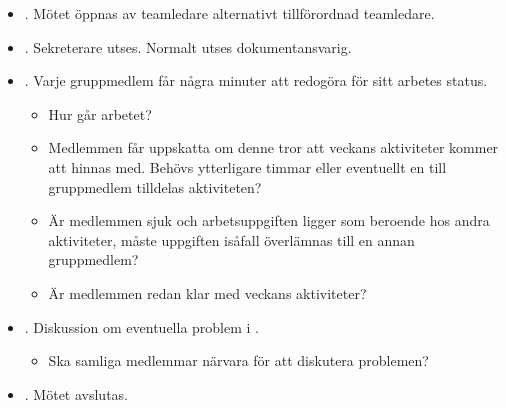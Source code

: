 \vspace{10mm}

\begin{itemize}
\item{. Mötet öppnas av teamledare alternativt tillförordnad teamledare.}
\item{. Sekreterare utses. Normalt utses dokumentansvarig.}
\item{. Varje gruppmedlem får några minuter att redogöra för sitt arbetes status.
  \begin{itemize}
  \item{Hur går arbetet?}
  \item{Medlemmen får uppskatta om denne tror att veckans aktiviteter kommer att hinnas med. Behövs ytterligare timmar eller eventuellt en till gruppmedlem tilldelas aktiviteten?}
  \item{Är medlemmen sjuk och arbetsuppgiften ligger som beroende hos andra aktiviteter, måste uppgiften isåfall överlämnas till en annan gruppmedlem?}
  \item{Är medlemmen redan klar med veckans aktiviteter?}
  \end{itemize}
}

\item{. Diskussion om eventuella problem i .
  \begin{itemize}
  \item{Ska samliga medlemmar närvara för att diskutera problemen?}
  \end{itemize}
}

\item{. Mötet avslutas.}
\end{itemize}


